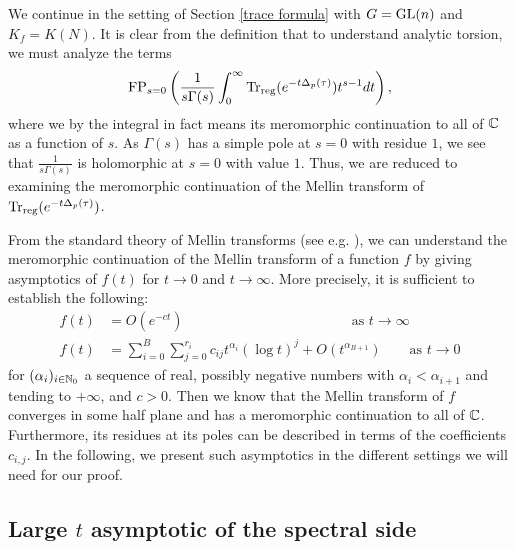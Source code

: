 \noindent We continue in the setting of Section \ref{trace formula} with $G=\operatorname{GL}(n)$ and $K_f=K(N)$. It is clear from the definition that to understand analytic torsion, we must analyze the terms
\begin{align}\label{mellin}
    \operatorname{FP}_{s=0}\left(\frac{1}{s\Gamma(s)}\int_0^\infty \operatorname{Tr}_{\operatorname{reg}}(e^{-t\Delta_p(\tau)})t^{s-1}dt\right),
\end{align}
where we by the integral in fact means its meromorphic continuation to all of $\mathbb{C}$ as a function of $s$. As $\Gamma(s)$ has a simple pole at $s=0$ with residue $1$, we see that $\frac{1}{s\Gamma(s)}$ is holomorphic at $s=0$ with value $1$. Thus, we are reduced to examining the meromorphic continuation of the Mellin transform of $\operatorname{Tr}_{\operatorname{reg}}(e^{-t\Delta_p(\tau)})$.

From the standard theory of Mellin transforms (see e.g. \cite{Zagier}), we can understand the meromorphic continuation of the Mellin transform of a function $f$ by giving asymptotics of $f(t)$ for $t\to 0$ and $t\to\infty$. More precisely, it is sufficient to establish the following:
\begin{align}\label{largef}
    f(t) &= O(e^{-ct}) \qquad\qquad\qquad\qquad\qquad\qquad \text{as }t\to\infty \\\label{smalltf}
    f(t) &= \sum_{i=0}^B\sum_{j=0}^{r_i}c_{ij}t^{\alpha_i}(\log t)^j +O(t^{\alpha_{B+1}}) \qquad \text{as }t\to 0
\end{align}
for $(\alpha_i)_{i\in\mathbb{N}_0}$ a sequence of real, possibly negative numbers with $\alpha_i<\alpha_{i+1}$ and tending to $+\infty$, and $c>0$. Then we know that the Mellin transform of $f$ converges in some half plane and has a meromorphic continuation to all of $\mathbb{C}$. Furthermore, its residues at its poles can be described in terms of the coefficients $c_{i,j}$. In the following, we present such asymptotics in the different settings we will need for our proof.


\subsection{Large $t$ asymptotic of the spectral side}

